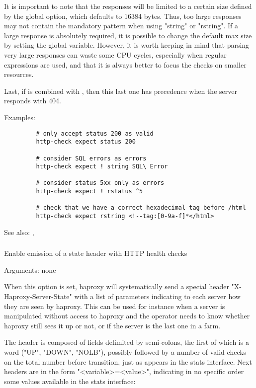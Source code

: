  It is important to note that the responses will be limited to a certain size
  defined by the global  option, which defaults to 16384 bytes.
  Thus, too large responses may not contain the mandatory pattern when using
  "string" or "rstring". If a large response is absolutely required, it is
  possible to change the default max size by setting the global variable.
  However, it is worth keeping in mind that parsing very large responses can
  waste some CPU cycles, especially when regular expressions are used, and that
  it is always better to focus the checks on smaller resources.

  Last, if  is combined with ,
  then this last one has precedence when the server responds with 404.

  Examples:
  \begin{verbatim}
         # only accept status 200 as valid
         http-check expect status 200

         # consider SQL errors as errors
         http-check expect ! string SQL\ Error

         # consider status 5xx only as errors
         http-check expect ! rstatus ^5

         # check that we have a correct hexadecimal tag before /html
         http-check expect rstring <!--tag:[0-9a-f]*</html>
  \end{verbatim}

  See also: , 

\subsubsection[http-check send-state]{}

  Enable emission of a state header with HTTP health checks
  
  
  Arguments: none

  When this option is set, haproxy will systematically send a special header
  "X-Haproxy-Server-State" with a list of parameters indicating to each server
  how they are seen by haproxy. This can be used for instance when a server is
  manipulated without access to haproxy and the operator needs to know whether
  haproxy still sees it up or not, or if the server is the last one in a farm.

  The header is composed of fields delimited by semi-colons, the first of which
  is a word ("UP", "DOWN", "NOLB"), possibly followed by a number of valid
  checks on the total number before transition, just as appears in the stats
  interface. Next headers are in the form "<variable>=<value>", indicating in
  no specific order some values available in the stats interface:
  
